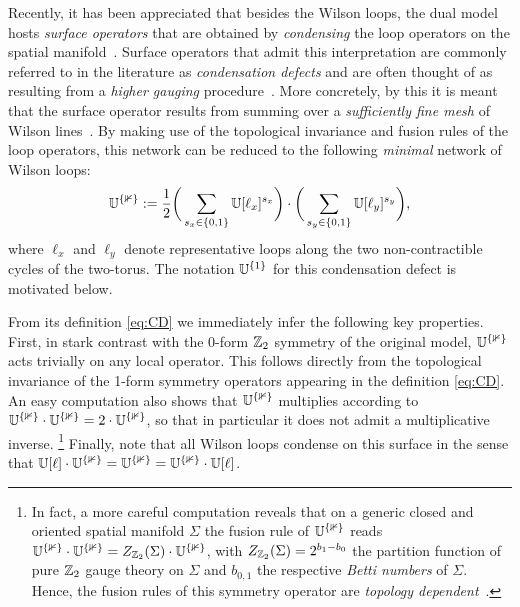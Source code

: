 Recently, it has been appreciated that besides the Wilson loops, the dual model hosts \emph{surface operators} that are obtained by \emph{condensing} the loop operators on the spatial manifold~\cite{Kong2014,Gaiotto2019,JohnsonFreyd2020}. Surface operators that admit this interpretation are commonly referred to in the literature as \emph{condensation defects} and are often thought of as resulting from a \emph{higher gauging} procedure~\cite{Choi2022,Choi2024,Delcamp2021,Lin2022,Roumpedakis2022}. More concretely, by this it is meant that the surface operator results from summing over a \emph{sufficiently fine mesh} of Wilson lines~\cite{Bhardwaj2017}. By making use of the topological invariance and fusion rules of the loop operators, this network can be reduced to the following \emph{minimal} network of Wilson loops:
\begin{equation}\label{eq:CD}
	\mathbb U^{\{\mathbb 1\}} := \frac{1}{2} \bigg( \sum_{s_x\in\{0,1\}}\mathbb U[\ell_x]^{s_x} \bigg) \cdot \bigg( \sum_{s_y\in\{0,1\}} \mathbb U[\ell_y]^{s_y} \bigg),
\end{equation}
where $\ell_x$ and $\ell_y$ denote representative loops along the two non-contractible cycles of the two-torus. The notation $\mathbb U^{\{1\}}$ for this condensation defect is motivated below.

From its definition \cref{eq:CD} we immediately infer the following key properties. First, in stark contrast with the 0-form $\mathbb Z_2$ symmetry of the original model, $\mathbb U^{\{\mathbb 1\}}$ acts trivially on any local operator. This follows directly from the topological invariance of the 1-form symmetry operators appearing in the definition \cref{eq:CD}. An easy computation also shows that $\mathbb U^{\{\mathbb 1\}}$ multiplies according to $\mathbb U^{\{\mathbb 1\}}\cdot\mathbb U^{\{\mathbb 1\}}=2 \cdot \mathbb U^{\{\mathbb 1\}}$, so that in particular it does not admit a multiplicative inverse. \footnote{In fact, a more careful computation reveals that on a generic closed and oriented spatial manifold $\Sigma$ the fusion rule of $\mathbb U^{\{\mathbb 1\}}$ reads $\mathbb U^{\{\mathbb 1\}}\cdot \mathbb U^{\{\mathbb 1\}} = Z_{\mathbb Z_2}(\Sigma) \cdot \mathbb U^{\{\mathbb 1\}}$, with $Z_{\mathbb Z_2}(\Sigma)=2^{b_1-b_0}$ the partition function of pure $\mathbb Z_2$ gauge theory on $\Sigma$ and $b_{0,1}$ the respective \emph{Betti numbers} of $\Sigma$. Hence, the fusion rules of this symmetry operator are \emph{topology dependent}~\cite{Roumpedakis2022,Delcamp2023}.} Finally, note that all Wilson loops condense on this surface in the sense that $\mathbb U[\ell]\cdot\mathbb U^{\{\mathbb 1\}} = \mathbb U^{\{\mathbb 1\}}= \mathbb U^{\{\mathbb 1\}}\cdot\mathbb U[\ell]$.

